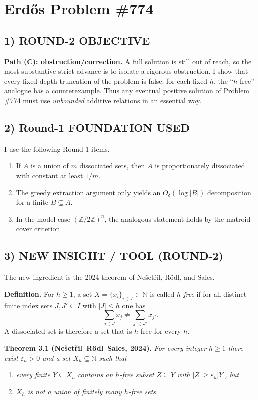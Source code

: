 \section{Erd\H{o}s Problem \#774}

\subsection*{1) ROUND-2 OBJECTIVE}
\textbf{Path (C): obstruction/correction.} A full solution is still out of reach, so the most substantive strict advance is to isolate a rigorous obstruction. I show that every fixed-depth truncation of the problem is false: for each fixed $h$, the ``$h$-free'' analogue has a counterexample. Thus any eventual positive solution of Problem \#774 must use \emph{unbounded} additive relations in an essential way.

\subsection*{2) Round-1 FOUNDATION USED}
I use the following Round-1 items.

\begin{enumerate}
\item If $A$ is a union of $m$ dissociated sets, then $A$ is proportionately dissociated with constant at least $1/m$.
\item The greedy extraction argument only yields an $O_\delta(\log |B|)$ decomposition for a finite $B\subseteq A$.
\item In the model case $(\mathbb Z/2\mathbb Z)^n$, the analogous statement holds by the matroid-cover criterion.
\end{enumerate}

\subsection*{3) NEW INSIGHT / TOOL (ROUND-2)}
The new ingredient is the 2024 theorem of Ne\v{s}et\v{r}il, R\"odl, and Sales.

\medskip
\noindent\textbf{Definition.} For $h\ge 1$, a set $X=\{x_i\}_{i\in I}\subset\mathbb N$ is called \emph{$h$-free} if for all distinct finite index sets $J,J'\subseteq I$ with $|J|\le h$ one has
\[
\sum_{j\in J}x_j\ne \sum_{j'\in J'}x_{j'}.
\]
A dissociated set is therefore a set that is $h$-free for every $h$.

\medskip
\noindent\textbf{Theorem 3.1 (Ne\v{s}et\v{r}il--R\"odl--Sales, 2024).} \emph{For every integer $h\ge 1$ there exist $\varepsilon_h>0$ and a set $X_h\subseteq\mathbb N$ such that}
\begin{enumerate}
\item \emph{every finite $Y\subseteq X_h$ contains an $h$-free subset $Z\subseteq Y$ with $|Z|\ge \varepsilon_h |Y|$, but}
\item \emph{$X_h$ is not a union of finitely many $h$-free sets.}
\end{enumerate}

